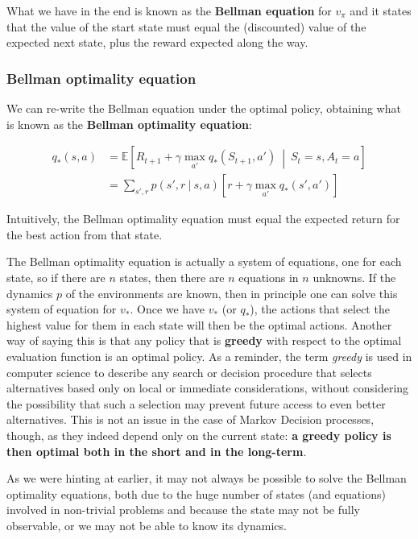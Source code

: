 What we have in the end is known as the \textbf{Bellman equation} for $v_\pi$ and it states that the value of the start state must equal the (discounted) value of the expected next state, plus the reward expected along the way.

\subsubsection{Bellman optimality equation}
We can re-write the Bellman equation under the optimal policy, obtaining what is known as the \textbf{Bellman optimality equation}:

\begin{equation}
    \begin{split}
        q_*(s,a) & = \mathbb{E} \left[ R_{t+1} + \gamma \max_{a'} q_* (S_{t+1}, a') \ \middle\vert \ S_t = s, A_t = a \right] \\
        & = \sum_{s', r} p(s',r \ \vert \ s,a) \left[ r + \gamma \max_{a'} q_*(s',a') \right]
    \end{split}
    \label{eq:ch2-bellmanoptimalityequation}
\end{equation}

Intuitively, the Bellman optimality equation must equal the expected return for the best action from that state. 

The Bellman optimality equation is actually a system of equations, one for each state, so if there are $n$ states, then there are $n$ equations in $n$ unknowns. If the dynamics $p$ of the environments are known, then in principle one can solve this system of equation for $v_*$. Once we have $v_*$ (or $q_*$), the actions that select the highest value for them in each state will then be the optimal actions. Another way of saying this is that any policy that is \textbf{greedy} with respect to the optimal evaluation function is an optimal policy. As a reminder, the term \textit{greedy} is used in computer science to describe any search or decision procedure that selects alternatives based only on local or immediate considerations, without considering the possibility that such a selection may prevent future access to even better alternatives. This is not an issue in the case of Markov Decision processes, though, as they indeed depend only on the current state: \textbf{a greedy policy is then optimal both in the short and in the long-term}.

As we were hinting at earlier, it may not always be possible to solve the Bellman optimality equations, both due to the huge number of states (and equations) involved in non-trivial problems and because the state may not be fully observable, or we may not be able to know its dynamics.

